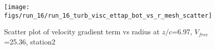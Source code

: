 \begin{figure}[H]
\centering
\texttt{[image: figs/run\_16/run\_16\_turb\_visc\_ettap\_bot\_vs\_r\_mesh\_scatter]}
\caption{Scatter plot of velocity gradient term vs radius at $z/c$=6.97, $V_{free}$=25.36, station2}
\label{fig:run_16_turb_visc_ettap_bot_vs_r_mesh_scatter}
\end{figure}


